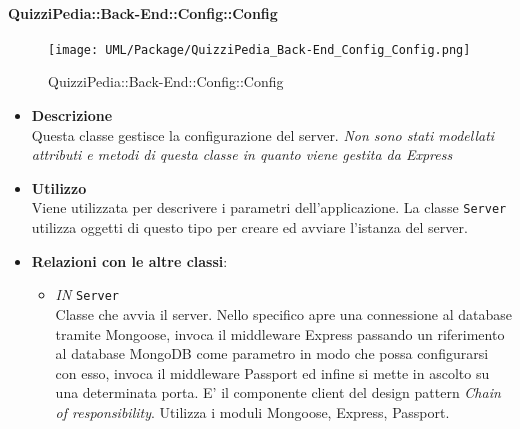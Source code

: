\paragraph{QuizziPedia::Back-End::Config::Config}
\label{QuizziPedia::Back-End::Config::Config}
\begin{figure}
	\centering
	\texttt{[image: UML/Package/QuizziPedia\_Back-End\_Config\_Config.png]}
	\caption{QuizziPedia::Back-End::Config::Config}
	\end{figure}
	\begin{itemize}
		\item \textbf{Descrizione} \\
		Questa classe gestisce la configurazione del server. \textit{Non sono stati modellati attributi e metodi di questa classe in quanto viene gestita da Express}
		\item \textbf{Utilizzo} \\
		Viene utilizzata per descrivere i parametri dell'applicazione. La classe \texttt{Server} utilizza oggetti di questo tipo per creare ed avviare l'istanza del server.
		\item \textbf{Relazioni con le altre classi}:
		 \begin{itemize}
		 	\item \textit{IN} \texttt{Server} \\
		 	Classe che avvia il server. Nello specifico apre una connessione al database tramite Mongoose, invoca il middleware\ped{G} Express passando un riferimento al database MongoDB come parametro in modo  che possa configurarsi con esso, invoca il middleware Passport ed infine si mette in ascolto su una determinata porta. E' il componente client del design pattern \textit{Chain of responsibility}. Utilizza i moduli Mongoose, Express, Passport.
		 \end{itemize}
	\end{itemize}
